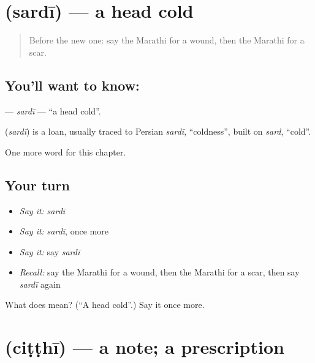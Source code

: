 \section[\texorpdfstring{\mr{सर्दी} (sardī)}{सर्दी (sardī)}]{ (sardī) — a head cold}

\label{lesson:MR-C200-sardi}



\begin{quote}
Before the new one: say the Marathi for a wound, then the Marathi for a scar.
\end{quote}

\subsection*{You'll want to know: }
\textbf{} — \emph{sardī} — \textquotedblleft{}a head cold\textquotedblright{}.

\begin{cousinweb}
\textbf{} (\emph{sardī}) is a loan, usually traced to Persian \emph{sardī}, \textquotedblleft{}coldness\textquotedblright{}, built on \emph{sard}, \textquotedblleft{}cold\textquotedblright{}.
\end{cousinweb}

\begin{grammarlens}[title={What you've built}]
One more word for this chapter.
\end{grammarlens}

\subsection*{Your turn}
\begin{itemize}
\raggedright
  \item \emph{Say it:} \emph{sardī}
  \item \emph{Say it:} \emph{sardī}, once more
  \item \emph{Say it:} say \emph{sardī}
  \item \emph{Recall:} say the Marathi for a wound, then the Marathi for a scar, then say \emph{sardī} again
\end{itemize}

\begin{tcolorbox}[breakable,colback=teal!4,colframe=teal!35!black,title={Before you move on}]
What does  mean? (\textquotedblleft{}A head cold\textquotedblright{}.) Say it once more.
\end{tcolorbox}
\section[\texorpdfstring{\mr{चिठ्ठी} (ciṭṭhī)}{चिठ्ठी (ciṭṭhī)}]{ (ciṭṭhī) — a note; a prescription}

